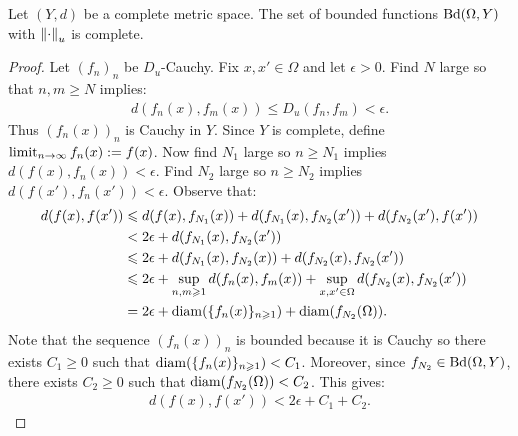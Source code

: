     \begin{proposition}
        Let $(Y,d)$ be a complete metric space. The set of bounded functions $\operatorname{Bd}(\Omega,Y)$ with $\left\lVert \cdot \right\rVert_u$ is complete.
    \end{proposition}
        \begin{proof}
            Let $(f_n)_n$ be $D_u$-Cauchy. Fix $x,x' \in \Omega$ and let $\epsilon > 0$. Find $N$ large so that $n,m \geq N$ implies:
                \begin{equation*}
                \begin{split}
                    d(f_n(x),f_m(x)) \leq D_u(f_n,f_m) < \epsilon.
                \end{split}
                \end{equation*}
            Thus $(f_n(x))_n$ is Cauchy in $Y$. Since $Y$ is complete, define $\operatorname*{limit}_{n \rightarrow \infty}f_n(x) := f(x)$. Now find $N_{1}$ large so $n \geq N_{1}$ implies $d(f(x),f_n(x)) < \epsilon$. Find $N_{2}$ large so $n \geq N_{2}$ implies $d(f(x'),f_n(x')) < \epsilon$. Observe that:
                \begin{equation*}
                \begin{split}
                    d(f(x),f(x'))
                    & \leqslant d(f(x),f_{N_1}(x)) + d(f_{N_1}(x),f_{N_2}(x')) + d(f_{N_2}(x'),f(x')) \\
                    & < 2\epsilon + d(f_{N_1}(x),f_{N_2}(x')) \\
                    & \leqslant 2\epsilon + d(f_{N_1}(x),f_{N_2}(x)) + d(f_{N_2}(x),f_{N_2}(x')) \\
                    & \leqslant 2\epsilon + \sup_{n,m \geqslant 1}d(f_n(x),f_m(x)) + \sup_{x,x' \in \Omega}d(f_{N_2}(x),f_{N_2}(x')) \\
                    & = 2\epsilon +\operatorname{diam}(\{f_n(x)\}_{n \geqslant 1}) + \operatorname{diam}(f_{N_2}(\Omega)).
                \end{split}
                \end{equation*}
            Note that the sequence $(f_n(x))_n$ is bounded because it is Cauchy \textemdash so there exists $C_1 \geq 0$ such that $\operatorname{diam}(\{f_n(x)\}_{n \geqslant 1}) < C_1$. Moreover, since $f_{N_2} \in \operatorname{Bd}(\Omega,Y)$, there exists $C_2 \geq 0$ such that $\operatorname{diam}(f_{N_2}(\Omega)) < C_2$. This gives:
                \begin{equation*}
                \begin{split}
                    d(f(x),f(x')) < 2\epsilon + C_1 + C_2.
                \end{split}

\end{equation*}
\end{proof}
